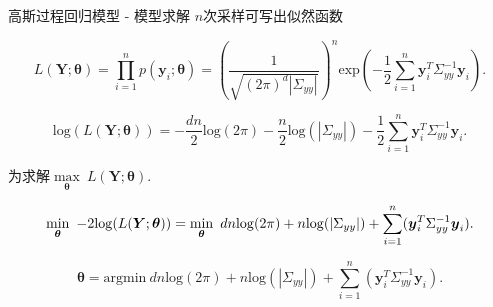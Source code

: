 \begin{frame}[fragile]{高斯过程回归模型 - 模型求解}
    $n$次采样可写出似然函数

    \begin{equation}
        L(\boldsymbol{Y};\boldsymbol{\theta})=\prod^{n}_{i=1}p(\boldsymbol{y}_{i};\boldsymbol{\theta})= (\frac{1}{\sqrt{(2\pi)^{d}|\Sigma_{yy}|}})^{n}\mathrm{exp}\left(-\frac{1}{2}\sum\limits^{n}_{i=1}\boldsymbol{y}^{T}_{i}\Sigma_{yy}^{-1}\boldsymbol{y}_{i}\right).
    \end{equation}

    \begin{equation}
        \mathrm{log}(L(\boldsymbol{Y};\boldsymbol{\theta})) = -\frac{dn}{2}\mathrm{log}(2\pi) - \frac{n}{2}\mathrm{log}(|\Sigma_{yy}|) - \frac{1}{2}\sum\limits^{n}_{i=1}\boldsymbol{y}^{T}_{i}\Sigma_{yy}^{-1}\boldsymbol{y}_{i}.
    \end{equation}

    为求解$\max\limits_{\boldsymbol{\theta}} \ L(\boldsymbol{Y};\boldsymbol{\theta}).$

    \begin{equation}
        \min_{\boldsymbol{\theta}} \ -2\mathrm{log}(L(\boldsymbol{Y};\boldsymbol{\theta})) = \min_{\boldsymbol{\theta}} \ dn\mathrm{log}(2\pi)+n\mathrm{log}(|\Sigma_{yy}|)+\sum\limits^{n}_{i=1}(\boldsymbol{y}_{i}^{T}\Sigma_{yy}^{-1}\boldsymbol{y}_{i}). \notag
    \end{equation}

    \begin{equation}
        \boldsymbol{\theta}=\mathrm{argmin} \ dn\mathrm{log}(2\pi)+n\mathrm{log}(|\Sigma_{yy}|)+\sum\limits^{n}_{i=1}(\boldsymbol{y}_{i}^{T}\Sigma_{yy}^{-1}\boldsymbol{y}_{i}).
    \end{equation}
\end{frame}

